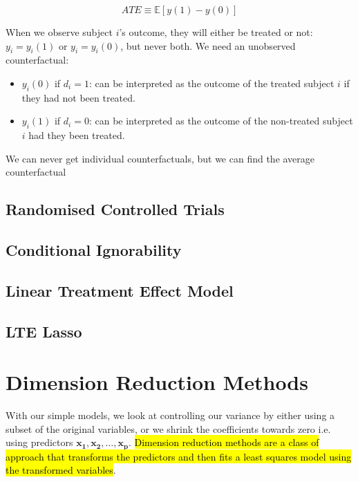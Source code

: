 \documentclass[11pt]{article}
\begin{document}
$$
ATE \equiv \mathbb{E}[y(1)-y(0)]
$$

When we observe subject $i$'s outcome, they will either be treated or not: $y_i = y_i(1)$ or $y_i = y_i(0)$, but never both. We need an unobserved counterfactual:

\begin{itemize}
    \item $y_i(0)$ if $d_i = 1$: can be interpreted as the outcome of the treated subject $i$ if they had not been treated.
    \item $y_i(1)$ if $d_i = 0$: can be interpreted as the outcome of the non-treated subject $i$ had they been treated.
\end{itemize}

\begin{note}
    We can never get individual counterfactuals, but we can find the average counterfactual
\end{note}

\subsection{Randomised Controlled Trials}

\subsection{Conditional Ignorability}

\subsection{Linear Treatment Effect Model}

\subsection{LTE Lasso}



\appendix

\clearpage

\section{Dimension Reduction Methods}

\label{appendix: dimension reduction}

With our simple models, we look at controlling our variance by either using a subset of the original variables, or we shrink the coefficients towards zero i.e. using predictors $\mathbf{x_1, x_2, \ldots, x_p}$. \hl{Dimension reduction methods are a class of approach that transforms the predictors and then fits a least squares model using the transformed variables}.
\end{document}
